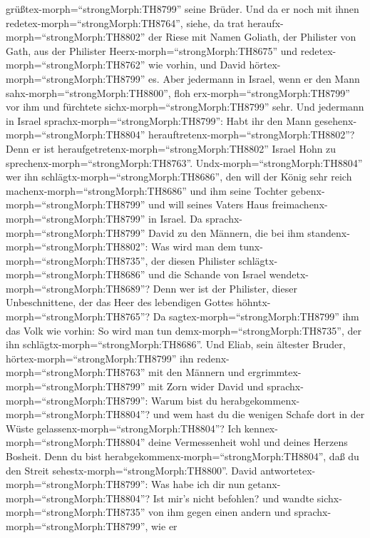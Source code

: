 grüßtex-morph=``strongMorph:TH8799'' seine Brüder.  Und da
er noch mit ihnen redetex-morph=``strongMorph:TH8764'', siehe, da trat
heraufx-morph=``strongMorph:TH8802'' der Riese mit Namen Goliath, der
Philister von Gath, aus der Philister Heerx-morph=``strongMorph:TH8675''
und redetex-morph=``strongMorph:TH8762'' wie vorhin, und David
hörtex-morph=``strongMorph:TH8799'' es.  Aber jedermann in
Israel, wenn er den Mann sahx-morph=``strongMorph:TH8800'', floh
erx-morph=``strongMorph:TH8799'' vor ihm und fürchtete
sichx-morph=``strongMorph:TH8799'' sehr.  Und jedermann in
Israel sprachx-morph=``strongMorph:TH8799'': Habt ihr den Mann
gesehenx-morph=``strongMorph:TH8804''
herauftretenx-morph=``strongMorph:TH8802''? Denn er ist
heraufgetretenx-morph=``strongMorph:TH8802'' Israel Hohn zu
sprechenx-morph=``strongMorph:TH8763''.
Undx-morph=``strongMorph:TH8804'' wer ihn
schlägtx-morph=``strongMorph:TH8686'', den will der König sehr reich
machenx-morph=``strongMorph:TH8686'' und ihm seine Tochter
gebenx-morph=``strongMorph:TH8799'' und will seines Vaters Haus
freimachenx-morph=``strongMorph:TH8799'' in Israel.  Da
sprachx-morph=``strongMorph:TH8799'' David zu den Männern, die bei ihm
standenx-morph=``strongMorph:TH8802'': Was wird man dem
tunx-morph=``strongMorph:TH8735'', der diesen Philister
schlägtx-morph=``strongMorph:TH8686'' und die Schande von Israel
wendetx-morph=``strongMorph:TH8689''? Denn wer ist der Philister, dieser
Unbeschnittene, der das Heer des lebendigen Gottes
höhntx-morph=``strongMorph:TH8765''?  Da
sagtex-morph=``strongMorph:TH8799'' ihm das Volk wie vorhin: So wird man
tun demx-morph=``strongMorph:TH8735'', der ihn
schlägtx-morph=``strongMorph:TH8686''.  Und Eliab, sein
ältester Bruder, hörtex-morph=``strongMorph:TH8799'' ihn
redenx-morph=``strongMorph:TH8763'' mit den Männern und
ergrimmtex-morph=``strongMorph:TH8799'' mit Zorn wider David und
sprachx-morph=``strongMorph:TH8799'': Warum bist du
herabgekommenx-morph=``strongMorph:TH8804''? und wem hast du die wenigen
Schafe dort in der Wüste gelassenx-morph=``strongMorph:TH8804''? Ich
kennex-morph=``strongMorph:TH8804'' deine Vermessenheit wohl und deines
Herzens Bosheit. Denn du bist
herabgekommenx-morph=``strongMorph:TH8804'', daß du den Streit
sehestx-morph=``strongMorph:TH8800''.  David
antwortetex-morph=``strongMorph:TH8799'': Was habe ich dir nun
getanx-morph=``strongMorph:TH8804''? Ist mir's nicht befohlen?
 und wandte sichx-morph=``strongMorph:TH8735'' von ihm
gegen einen andern und sprachx-morph=``strongMorph:TH8799'', wie er
